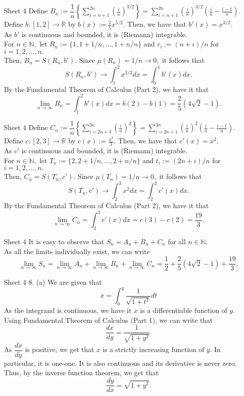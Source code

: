 \documentclass[handout, aspectratio=169]{beamer}
\begin{document}
\begin{frame}{Sheet 4}
	Define $B_n := \displaystyle\dfrac{1}{n}\left\{\sum_{i=n+1}^{2n}\left(\frac{i}{n}\right)^{3/2}\right\} =\sum_{i=n+1}^{2n}\left(\frac{i}{n}\right)^{3/2}\left(\frac{i}{n} - \frac{i-1}{n}\right).$\\
	Define $b:[1, 2] \to \mathbb{R}$ by $b(x) := \frac{2}{5}x^{5/2}.$ Then, we have that $b'(x) = x^{3/2}.$\\
	As $b'$ is continuous and bounded, it is (Riemann) integrable. \\
	For $n \in \mathbb{N},$ let $R_n := \{1, 1+1/n, \ldots, 1+n/n\}$ and $r_i := (n+i)/n$ for $i = 1, 2, \ldots, n.$\\
	Then, $B_n = S(R_n, b').$ Since $\mu(R_n) = 1/n \to 0,$ it follows that
	\[S(R_n, b') \to \int_{1}^{2} x^{3/2} dx = \int_{0}^{1} b'(x) dx. \]
	By the Fundamental Theorem of Calculus (Part 2), we have it that
	\[\lim_{n\to \infty}B_n = \int_{1}^{2} b'(x) dx = b(2) - b(1) = \dfrac{2}{5}(4\sqrt{2} - 1).\]

\end{frame}

\begin{frame}{Sheet 4}
	Define $C_n := \displaystyle\dfrac{1}{n}\left\{\sum_{i=2n+1}^{3n}\left(\frac{i}{n}\right)^{2}\right\} =\sum_{i=2n+1}^{3n}\left(\frac{i}{n}\right)^{2}\left(\frac{i}{n} - \frac{i-1}{n}\right).$\\
	Define $c:[2, 3] \to \mathbb{R}$ by $c(x) := \frac{x^3}{3}.$ Then, we have that $c'(x) = x^{2}.$\\
	As $c'$ is continuous and bounded, it is (Riemann) integrable. \\
	For $n \in \mathbb{N},$ let $T_n := \{2, 2+1/n, \ldots, 2+n/n\}$ and $t_i := (2n+i)/n$ for $i = 1, 2, \ldots, n.$\\
	Then, $C_n = S(T_n, c').$ Since $\mu(T_n) = 1/n \to 0,$ it follows that
	\[S(T_n, c') \to \int_{2}^{3} x^{2} dx = \int_{2}^{3} c'(x) dx. \]
	By the Fundamental Theorem of Calculus (Part 2), we have it that
	\[\lim_{n\to \infty}C_n = \int_{2}^{3} c'(x) dx = c(3) - c(2) = \dfrac{19}{3}.\]
\end{frame}
\begin{frame}{Sheet 4}
	It is easy to observe that $S_n = A_n + B_n + C_n$ for all $n \in \mathbb{N}.$\\
	As all the limits individually exist, we can write
	\[\lim_{n\to \infty}S_n = \lim_{n\to \infty}A_n + \lim_{n\to \infty}B_n + \lim_{n\to \infty}C_n = \dfrac{1}{2} + \dfrac{2}{5}(4\sqrt{2} - 1) + \dfrac{19}{3}.\]
\end{frame}
\begin{frame}{Sheet 4}
	8. (a) We are given that
	\[x = \int_{0}^{y} \frac{1}{\sqrt{1 + t^2}} dt \]
	As the integrand is continuous, we have it $x$ is a differentiable function of $y.$ Using Fundamental Theorem of Calculus (Part 1), we can write that
	\[\frac{dx}{dy} = \frac{1}{\sqrt{1 + y^2}}.\]
	As $\dfrac{dx}{dy}$ is positive, we get that $x$ is a strictly increasing function of $y.$ In particular, it is one-one. It is also continuous and its derivative is never zero. Thus, by the inverse function theorem, we get that
	\[\frac{dy}{dx} = \sqrt{1 + y^2}.\]
\end{frame}
	
\end{document}

